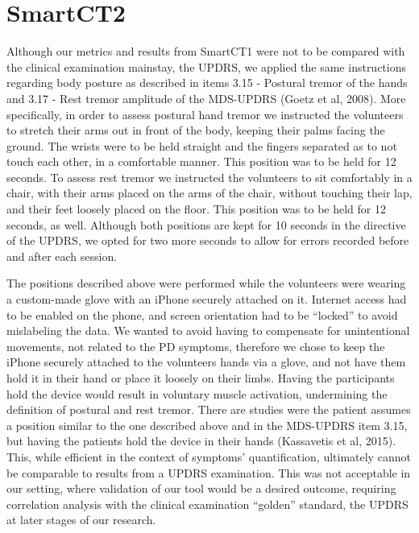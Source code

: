 \section{SmartCT2}
\label{sec:SmartCT2}

Although our metrics and results from \gls{SmartCT1} were not to be compared with the clinical examination mainstay, the \gls{UPDRS}, we applied the same instructions regarding body posture as described in items 3.15 - Postural tremor of the hands and 3.17 - Rest tremor amplitude of the \gls{MDS}-\gls{UPDRS} (Goetz et al, 2008). More specifically, in order to assess postural hand tremor we instructed the volunteers to stretch their arms out in front of the body, keeping their palms facing the ground. The wrists were to be held straight and the fingers separated as to not touch each other, in a comfortable manner. This position was to be held for 12 seconds. To assess rest tremor we instructed the volunteers to sit comfortably in a chair, with their arms placed on the arms of the chair, without touching their lap, and their feet loosely placed on the floor. This position was to be held for 12 seconds, as well. Although both positions are kept for 10 seconds in the directive of the \gls{UPDRS}, we opted for two more seconds to allow for errors recorded before and after each session. 

The positions described above were performed while the volunteers were wearing a custom-made glove with an iPhone securely attached on it. Internet access had to be enabled on the phone, and screen orientation had to be ``locked'' to avoid mislabeling the data. We wanted to avoid having to compensate for unintentional movements, not related to the \gls{PD} symptoms, therefore we chose to keep the iPhone securely attached to the volunteers hands via a glove, and not have them hold it in their hand or place it loosely on their limbs. Having the participants hold the device would result in voluntary muscle activation, undermining the definition of postural and rest tremor. There are studies were the patient assumes a position similar to the one described above and in the \gls{MDS}-\gls{UPDRS} item 3.15, but having the patients hold the device in their hands (Kassavetis et al, 2015). This, while efficient in the context of symptoms' quantification, ultimately cannot be comparable to results from a \gls{UPDRS} examination. This was not acceptable in our setting, where validation of our tool would be a desired outcome, requiring correlation analysis with the clinical examination ``golden'' standard, the \gls{UPDRS} at later stages of our research. 



